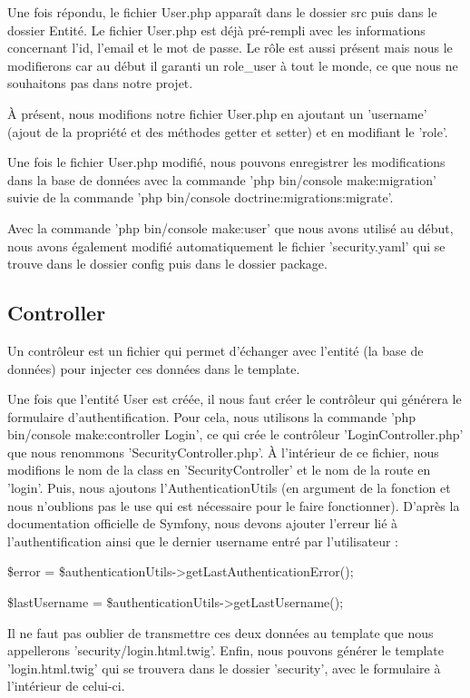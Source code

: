 \documentclass{article}
\theoremstyle{definition}
\theoremstyle{remark}
\begin{document}
Une fois répondu, le fichier User.php apparaît dans le dossier src puis dans le dossier Entité. Le fichier User.php est déjà pré-rempli avec les informations concernant l'id, l'email et le mot de passe. Le rôle est aussi présent mais nous le modifierons car au début il garanti un role_user à tout le monde, ce que nous ne souhaitons pas dans notre projet. 

À présent, nous modifions notre fichier User.php en ajoutant un 'username' (ajout de la propriété et des méthodes getter et setter) et en modifiant le 'role'.

Une fois le fichier User.php modifié, nous pouvons enregistrer les modifications dans la base de données avec la commande 'php bin/console make:migration' suivie de la commande 'php bin/console doctrine:migrations:migrate'.

Avec la commande 'php bin/console make:user' que nous avons utilisé au début, nous avons également modifié automatiquement le fichier 'security.yaml' qui se trouve dans le dossier config puis dans le dossier package.

\subsection{Controller}

Un contrôleur est un fichier qui permet d'échanger avec l'entité (la base de données) pour injecter ces données dans le template.

Une fois que l'entité User est créée, il nous faut créer le contrôleur qui générera le formulaire d'authentification. Pour cela, nous utilisons la commande 'php bin/console make:controller Login', ce qui crée le contrôleur 'LoginController.php' que nous renommons 'SecurityController.php'. À l'intérieur de ce fichier, nous modifions le nom de la class en 'SecurityController' et le nom de la route en 'login'. Puis, nous ajoutons l'AuthenticationUtils (en argument de la fonction et nous n'oublions pas le use qui est nécessaire pour le faire fonctionner). D'après la documentation officielle de Symfony, nous devons ajouter l'erreur lié à l'authentification ainsi que le dernier username entré par l'utilisateur :

\$error = \$authenticationUtils->getLastAuthenticationError();

\$lastUsername = \$authenticationUtils->getLastUsername();

Il ne faut pas oublier de transmettre ces deux données au template que nous appellerons 'security/login.html.twig'. Enfin, nous pouvons générer le template 'login.html.twig' qui se trouvera dans le dossier 'security', avec le formulaire à l'intérieur de celui-ci.
\end{document}
